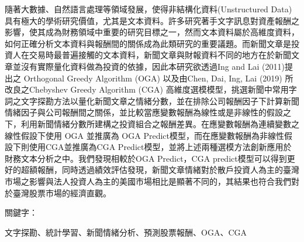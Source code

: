  \begin{abstractzh}
隨著大數據、自然語言處理等領域發展，使得非結構化資料(Unstructured Data)具有極大的學術研究價值，尤其是文本資料。許多研究著手文字訊息對資產報酬之影響，使其成為財務領域中重要的研究目標之一，然而文本資料屬於高維度資料，如何正確分析文本資料與報酬間的關係成為此類研究的重要議題。而新聞文章是投資人在交易時最普遍接觸的文本資料，新聞文章與財報資料不同的地方在於新聞文章並沒有實際量化資料做為投資的依據，因此本研究欲透過Ing and Lai (2011)提出之 Orthogonal Greedy Algorithm (OGA) 以及由Chen, Dai, Ing, Lai (2019) 所改良之Chebyshev Greedy Algorithm (CGA) 高維度選模模型，挑選新聞中常用字詞之文字探勘方法以量化新聞文章之情緒分數，並在排除公司報酬因子下計算新聞情緒因子與公司報酬間之關係，並比較當應變數報酬為線性或是非線性的假設之下，利用新聞情緒分數所建構之投資組合之報酬差異。在應變數報酬為連續變數之線性假設下使用 OGA 並推廣為 OGA Predict模型，而在應變數報酬為非線性假設下則使用CGA並推廣為CGA Predict模型，並將上述兩種選模方法創新應用於財務文本分析之中。我們發現相較於OGA Predict，CGA predict模型可以得到更好的超額報酬，同時透過績效評估發現，新聞文章情緒對於散戶投資人為主的臺灣市場之影響與法人投資人為主的美國市場相比是顯著不同的，其結果也符合我們對於臺灣股票市場的經濟直觀。
~\\
\par
\noindent 
關鍵字：
\par
\noindent 文字探勘、統計學習、新聞情緒分析、預測股票報酬、OGA、CGA
\end{abstractzh}



